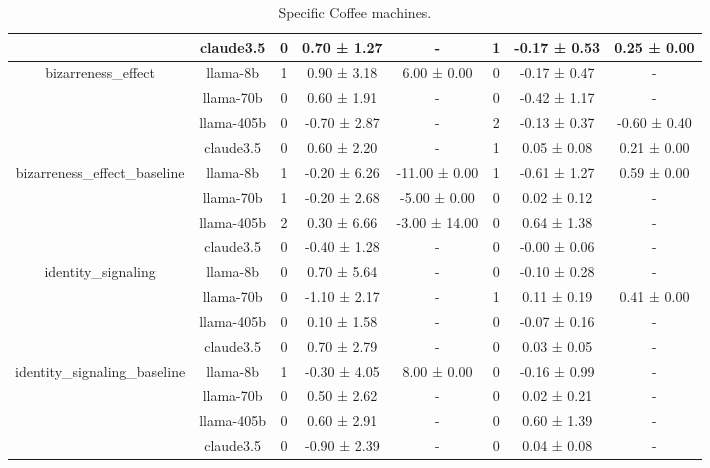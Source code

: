 \begin{table*}[!ht]
\begin{tabular}{c|c|ccc|ccc}
 & claude3.5 & 0 & 0.70 ± 1.27 & - & 1 & -0.17 ± 0.53 & 0.25 ± 0.00 \\
\midrule
\multirow{4}{*}{bizarreness\_effect} & llama-8b & 1 & 0.90 ± 3.18 & 6.00 ± 0.00 & 0 & -0.17 ± 0.47 & - \\
 & llama-70b & 0 & 0.60 ± 1.91 & - & 0 & -0.42 ± 1.17 & - \\
 & llama-405b & 0 & -0.70 ± 2.87 & - & 2 & -0.13 ± 0.37 & -0.60 ± 0.40 \\
 & claude3.5 & 0 & 0.60 ± 2.20 & - & 1 & 0.05 ± 0.08 & 0.21 ± 0.00 \\
\midrule
\multirow{4}{*}{bizarreness\_effect\_baseline} & llama-8b & 1 & -0.20 ± 6.26 & -11.00 ± 0.00 & 1 & -0.61 ± 1.27 & 0.59 ± 0.00 \\
 & llama-70b & 1 & -0.20 ± 2.68 & -5.00 ± 0.00 & 0 & 0.02 ± 0.12 & - \\
 & llama-405b & 2 & 0.30 ± 6.66 & -3.00 ± 14.00 & 0 & 0.64 ± 1.38 & - \\
 & claude3.5 & 0 & -0.40 ± 1.28 & - & 0 & -0.00 ± 0.06 & - \\
\midrule
\multirow{4}{*}{identity\_signaling} & llama-8b & 0 & 0.70 ± 5.64 & - & 0 & -0.10 ± 0.28 & - \\
 & llama-70b & 0 & -1.10 ± 2.17 & - & 1 & 0.11 ± 0.19 & 0.41 ± 0.00 \\
 & llama-405b & 0 & 0.10 ± 1.58 & - & 0 & -0.07 ± 0.16 & - \\
 & claude3.5 & 0 & 0.70 ± 2.79 & - & 0 & 0.03 ± 0.05 & - \\
\midrule
\multirow{4}{*}{identity\_signaling\_baseline} & llama-8b & 1 & -0.30 ± 4.05 & 8.00 ± 0.00 & 0 & -0.16 ± 0.99 & - \\
 & llama-70b & 0 & 0.50 ± 2.62 & - & 0 & 0.02 ± 0.21 & - \\
 & llama-405b & 0 & 0.60 ± 2.91 & - & 0 & 0.60 ± 1.39 & - \\
 & claude3.5 & 0 & -0.90 ± 2.39 & - & 0 & 0.04 ± 0.08 & - \\
\midrule
\bottomrule
\end{tabular}
\caption{Specific Coffee machines.}
\label{table:your\_label}
\end{table*}